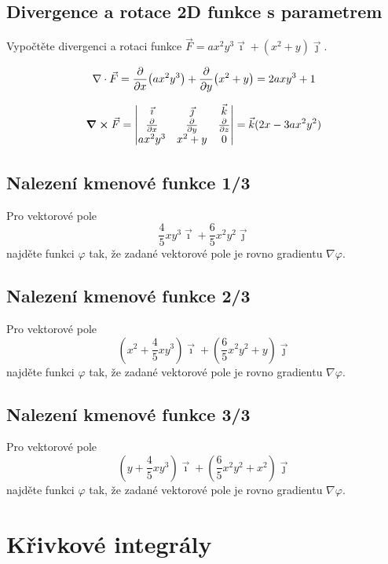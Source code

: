 \subsection{Divergence a rotace 2D funkce s parametrem}
Vypočtěte divergenci a rotaci funkce $\vec F=ax^2y^3\vec \imath + (x^2+y)\vec\jmath$.

\reseni

$$\nabla\cdot \vec F=\pdv{x}(ax^2y^3)+\pdv{y}(x^2+y)=2axy^3+1$$

 $$\curl \vec F=
 \begin{vmatrix}
   \vec\imath & \vec \jmath & \vec k\\
   \pdv{x} & \pdv{y} & \pdv{z} \\
   ax^2y^3 & x^2+y & 0
 \end{vmatrix}
 =\vec k(2x-3ax^2y^2)
 $$

\konec


\subsection{Nalezení kmenové funkce 1/3}

Pro vektorové pole $$\frac 45 x y^3\vec \imath + \frac 65x^2y^2\vec\jmath$$ najděte funkci $\varphi$ tak, že zadané vektorové pole je rovno gradientu $\nabla \varphi.$

\subsection{Nalezení kmenové funkce 2/3}

Pro vektorové pole $$\left(x^2+\frac 45 x y^3\right)\vec \imath + \left(\frac 65x^2y^2+y\right)\vec\jmath$$ najděte funkci $\varphi$ tak, že zadané vektorové pole je rovno gradientu $\nabla \varphi.$

\subsection{Nalezení kmenové funkce 3/3}

Pro vektorové pole $$\left(y+\frac 45 x y^3\right)\vec \imath + \left(\frac 65x^2y^2+x^2\right)\vec\jmath$$ najděte funkci $\varphi$ tak, že zadané vektorové pole je rovno gradientu $\nabla \varphi.$




\section{Křivkové integrály}





